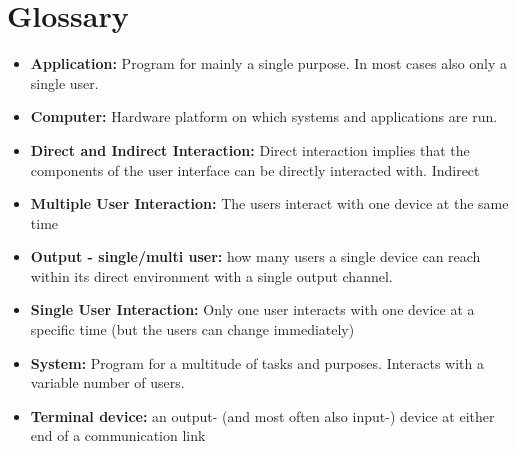 \section{Glossary}

\begin{itemize}
\item \textbf{Application:} Program for mainly a single purpose. In most cases also only a single user.
\item \textbf{Computer:} Hardware platform on which systems and applications are run.
\item \textbf{Direct and Indirect Interaction:} Direct interaction implies that the components of the user interface can be directly interacted with. Indirect 
\item \textbf{Multiple User Interaction:} The users interact with one device at the same time 
\item \textbf{Output - single/multi user:} how many users a single device can reach within its direct environment with a single output channel.
\item \textbf{Single User Interaction:} Only one user interacts with one device  at a specific time (but the users can change immediately)
\item \textbf{System:} Program for a multitude of tasks and purposes. Interacts with a variable number of users.
\item \textbf{Terminal device:} an output- (and most often also input-) device at either end of a communication link
\end{itemize}